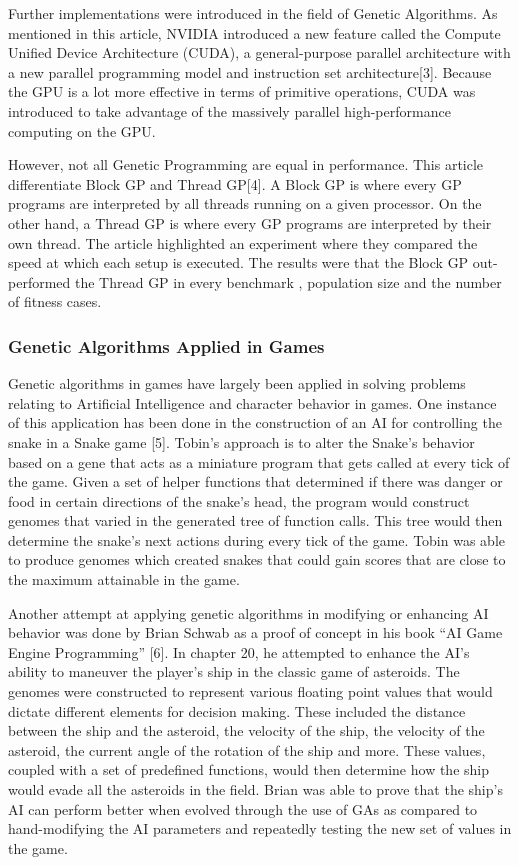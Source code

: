 	Further implementations were introduced in the field of Genetic Algorithms.  As mentioned in this article, NVIDIA introduced a new feature called the Compute Unified Device Architecture (CUDA), 
	a general-purpose parallel architecture with a new parallel programming model and instruction set architecture[3].  Because the GPU is a lot more effective in terms of primitive operations, 
	CUDA was introduced to take advantage of the massively parallel high-performance computing on the GPU.  

	However, not all Genetic Programming are equal in performance.  This article  differentiate Block GP and Thread GP[4].  A Block GP is where every GP programs are 
	interpreted by all threads running on a given processor.  On the other hand, a Thread GP is where every GP programs are interpreted by their own thread.  The article 
	highlighted an experiment where they compared the speed at which each setup is executed.  The results were that the Block GP out-performed the Thread GP in every benchmark , 
	population size and the number of fitness cases.

\subsubsection*{Genetic Algorithms Applied in Games}	

	Genetic algorithms in games have largely been applied in solving problems relating to Artificial Intelligence and character behavior in games. One instance of this application 
	has been done in the construction of an AI for controlling the snake in a Snake game [5]. Tobin's approach is to alter the Snake's behavior based on a gene that acts as a miniature 
	program that gets called at every tick of the game. Given a set of helper functions that determined if there was danger or food in certain directions of the snake's head, the program 
	would construct genomes that varied in the generated tree of function calls. This tree would then determine the snake's next actions during every tick of the game. Tobin was able to 
	produce genomes which created snakes that could gain scores that are close to the maximum attainable in the game.  

	Another attempt at applying genetic algorithms in modifying or 
	enhancing AI behavior was done by Brian Schwab as a proof of concept in his book “AI Game Engine Programming” [6]. In chapter 20, he attempted to enhance the AI's ability to maneuver 
	the player's ship in the classic game of asteroids. The genomes were constructed to represent various floating point values that would dictate different elements for decision making. 
	These included the distance between the ship and the asteroid, the velocity of the ship, the velocity of the asteroid, the current angle of the rotation of the ship and more. 
	These values, coupled with a set of predefined functions, would then determine how the ship would evade all the asteroids in the field. Brian was able to prove that the ship's AI can 
	perform better when evolved through the use of GAs as compared to hand-modifying the AI parameters and repeatedly testing the new set of values in the game.
	
